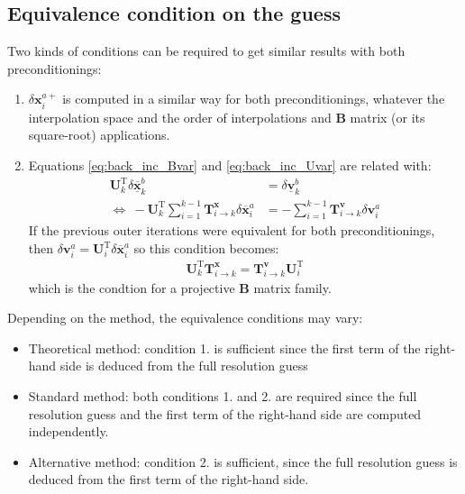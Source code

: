 \documentclass[12pt]{scrartcl}
\begin{document}
\subsection{Equivalence condition on the guess}
Two kinds of conditions can be required to get similar results with both preconditionings:
\begin{enumerate}
\item $\delta \mathbf{x}^{a+}_i$ is computed in a similar way for both preconditionings, whatever the interpolation space and the order of interpolations and $\mathbf{B}$ matrix (or its square-root) applications.
\item Equations \eqref{eq:back_inc_Bvar} and \eqref{eq:back_inc_Uvar} are related with:
\begin{align}
\mathbf{U}^\mathrm{T}_k \delta \underline{\overline{\mathbf{x}}}^b_k & = \delta \underline{\mathbf{v}}^b_k \nonumber \\
\Leftrightarrow \ - \mathbf{U}^\mathrm{T}_k  \sum_{i=1}^{k-1} \mathbf{T}^\mathbf{x}_{i \rightarrow k} \delta \overline{\mathbf{x}}^a_i & = - \sum_{i=1}^{k-1} \mathbf{T}^\mathbf{v}_{i \rightarrow k} \delta \mathbf{v}^a_i
\end{align}
If the previous outer iterations were equivalent for both preconditionings, then $\delta \mathbf{v}^a_i = \mathbf{U}^\mathrm{T}_i \delta \overline{\mathbf{x}}^a_i$ so this condition becomes:
\begin{align}
\mathbf{U}^\mathrm{T}_k \mathbf{T}^\mathbf{x}_{i \rightarrow k} = \mathbf{T}^\mathbf{v}_{i \rightarrow k} \mathbf{U}^\mathrm{T}_i
\end{align}
which is the condtion for a projective $\mathbf{B}$ matrix family.
\end{enumerate}

Depending on the method, the equivalence conditions may vary:
\begin{itemize}
\item Theoretical method: condition 1. is sufficient since the first term of the right-hand side is deduced from the full resolution guess
\item Standard method: both conditions 1. and 2. are required since the full resolution guess and the first term of the right-hand side are computed independently.
\item Alternative method: condition 2. is sufficient, since the full resolution guess is deduced from the first term of the right-hand side.
\end{itemize}
\end{document}
